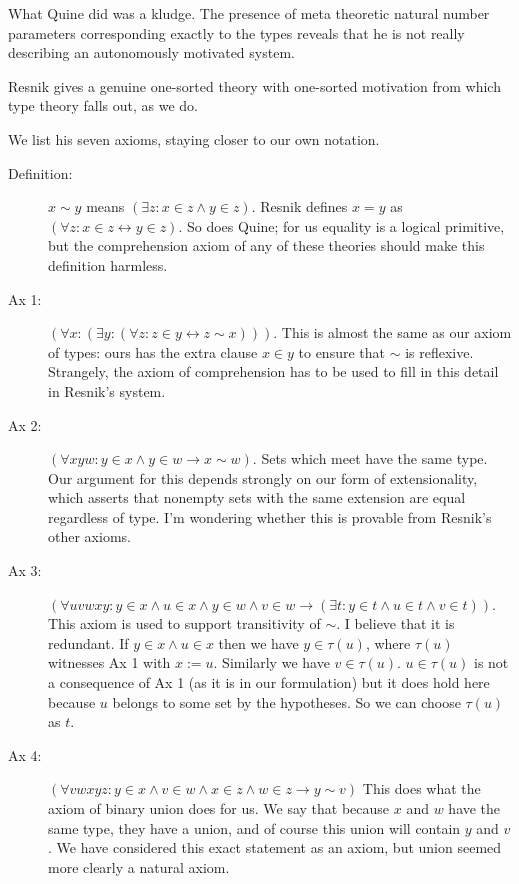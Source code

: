 \documentclass[12pt]{article}
\begin{document}
What Quine did was a kludge.  The presence of meta theoretic natural number parameters corresponding exactly to the types
reveals that he is not really describing an autonomously motivated system.

Resnik gives a genuine one-sorted theory with one-sorted motivation from which type theory falls out, as we do.

We list his seven axioms, staying closer to our own notation.

\begin{description}

\item[Definition:]  $x \sim y$ means $(\exists z:x \in z \wedge y \in z)$.  Resnik defines
$x=y$ as $(\forall z:x \in z \leftrightarrow y \in z)$.  So does Quine; for us equality is a logical primitive, but the comprehension axiom
of any of these theories should make this definition harmless.

\item[Ax 1:]  $(\forall x:(\exists y:(\forall z:z \in y \leftrightarrow z \sim x)))$.  This is almost the same as our axiom of types:  ours has the extra clause $x \in y$ to ensure that $\sim$ is reflexive.  Strangely, the axiom of comprehension has to be used to fill in this detail in Resnik's system.

\item[Ax 2:] $(\forall xyw:y \in x \wedge y \in w \rightarrow x \sim w)$.  Sets which meet have the same type.   Our argument for this depends strongly on our form of extensionality, which asserts that nonempty sets with the same extension are equal regardless of type.  I'm wondering whether this is provable from Resnik's other axioms.  

\item[Ax 3:]  $(\forall uvwxy:  y \in x \wedge u \in x \wedge y \in w \wedge v \in w \rightarrow (\exists t:y \in t \wedge u \in t \wedge v \in t))$.  This axiom is used to support transitivity of $\sim$.  I believe that it is redundant.  If $y \in x \wedge u \in x$ then we have $y \in \tau(u)$, where $\tau(u)$ witnesses
Ax 1 with $x := u$.  Similarly we have $v \in \tau(u)$.  $u \in \tau(u)$ is not a consequence of Ax 1 (as it is in our formulation) but it does hold here because
$u$ belongs to some set by the hypotheses.  So we can choose $\tau(u)$ as $t$.

\item[Ax 4:]  $(\forall vwxyz:y \in x \wedge v \in w \wedge x \in z \wedge w \in z \rightarrow y \sim v)$  This does what the axiom of binary union does for us.  We say that because $x$ and $w$ have the same type, they have a union, and of course this union will contain $y$ and $v$.  We have considered this exact statement as an axiom, but union seemed more clearly a natural axiom.


\end{description}
\end{document}
